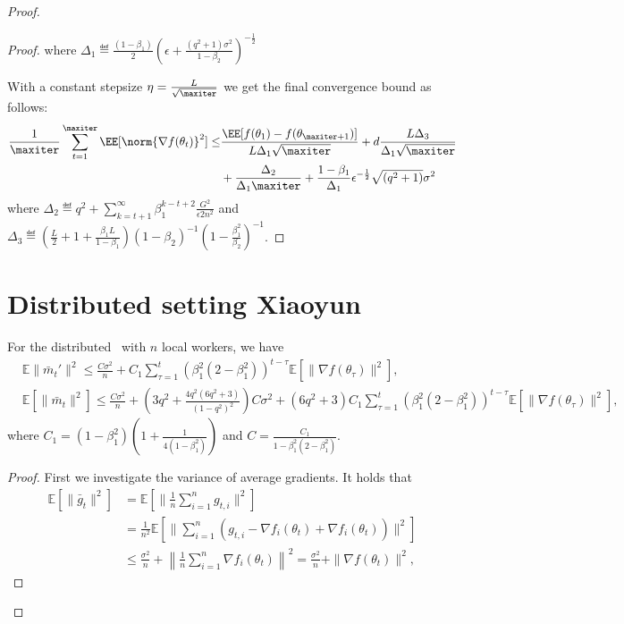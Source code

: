 \documentclass[11pt]{article}
\begin{document}
\begin{proof}
\begin{proof}
where $\Delta_1 \eqdef \frac{(1-\beta_1)}{2} (\epsilon + \frac{(q^2+1)\sigma^2}{1 - \beta_2})^{-\frac{1}{2}}$

With a constant stepsize $\eta = \frac{L}{\sqrt{\maxiter}}$ we get the final convergence bound as follows:
\begin{equation}
\begin{split}
 \frac{1}{\maxiter}\sum_{t=1}^{\maxiter} \EE[\norm{\nabla f(\theta_t)}^2] \leq & \frac{\EE[ f(\theta_{1}) - f(\theta_{\maxiter+1})]}{L \Delta_1 \sqrt{\maxiter}} + 
d\frac{L \Delta_3}{\Delta_1 \sqrt{\maxiter}} \\
& + \frac{\Delta_2}{ \Delta_1\maxiter} +\frac{1-\beta_1}{\Delta_1}  \epsilon^{-\frac{1}{2}} \sqrt{(q^2+1)}\sigma^2 
\end{split}
\end{equation}
where $\Delta_2 \eqdef q^2 + \sum_{k=t+1}^\infty  \beta_1^{k-t+2}\frac{G^2 }{\epsilon 2n^2}$ and $\Delta_3 \eqdef \left(\frac{L}{2} + 1+ \frac{\beta_1L}{1-\beta_1} \right) (1-\beta_2)^{-1} (1 - \frac{\beta_1^{2}}{\beta_2})^{-1}$.


\end{proof}



\clearpage

\section{Distributed setting Xiaoyun}

\begin{Lemma} \label{lemma:m_t,m_t' distributed}
For the distributed \algo\ with $n$ local workers, we have
\begin{align*}
    &\mathbb E\|\bar m_t'\|^2\leq \frac{C\sigma^2}{n}+C_1 \sum_{\tau=1}^t (\beta_1^2(2-\beta_1^2))^{t-\tau}\mathbb E[\|\nabla f(\theta_\tau)\|^2],\\
    &\mathbb E[\|\bar m_t\|^2]\leq \frac{C\sigma^2}{n}+(3q^2+\frac{4q^2(6q^2+3)}{(1-q^2)^2})C\sigma^2+(6q^2+3)C_1\sum_{\tau=1}^t (\beta_1^2(2-\beta_1^2))^{t-\tau}\mathbb E[\|\nabla f(\theta_\tau)\|^2],
\end{align*}
where $C_1=(1-\beta_1^2)(1+\frac{1}{4(1-\beta_1^2)})$ and $C=\frac{C_1}{1-\beta_1^2(2-\beta_1^2)}$.
\end{Lemma}

\begin{proof}
First we investigate the variance of average gradients. It holds that
\begin{align*}
    \mathbb E[\|\bar g_t\|^2]&=\mathbb E\left[\|\frac{1}{n}\sum_{i=1}^n g_{t,i}\|^2\right]\\
    &=\frac{1}{n^2} \mathbb E\left[\|\sum_{i=1}^n (g_{t,i}-\nabla f_i(\theta_t)+\nabla f_i(\theta_t))\|^2 \right]\\
    &\leq \frac{\sigma^2}{n}+\left\| \frac{1}{n}\sum_{i=1}^n \nabla f_i(\theta_t)\right\|^2=\frac{\sigma^2}{n}+\|\nabla f(\theta_t)\|^2,
\end{align*}


\end{proof}
\end{proof}
\end{document}
